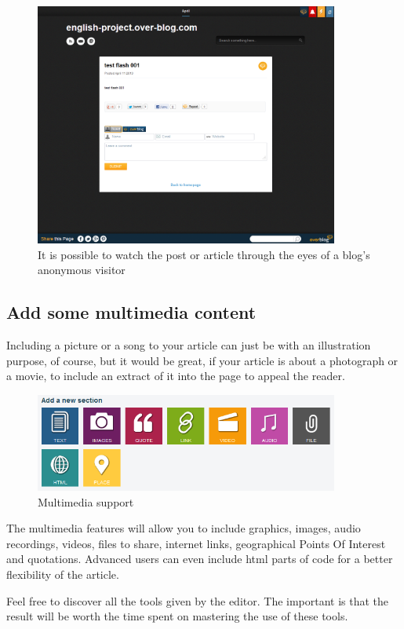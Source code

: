 \documentclass[a4paper,10pt]{article}
\begin{document}
\begin{figure}[H]
    \center
	\includegraphics[width=10cm]{Images/view001.png}
    \caption{It is possible to watch the post or article through the eyes of a blog's anonymous visitor}
\end{figure}

\newpage

\subsection{Add some multimedia content}

Including a picture or a song to your article can just be with an illustration purpose, of course, but it would be great, if your article is about a photograph or a movie, to include an extract of it into the page to appeal the reader. 

\begin{figure}[H]
    \center
	\includegraphics[width=10cm]{Images/multimedia001.png}
    \caption{Multimedia support}
\end{figure}

The multimedia features will allow you to include graphics, images, audio recordings, videos, files to share, internet links, geographical Points Of Interest and quotations. Advanced users can even include html parts of code for a better flexibility of the article. 

Feel free to discover all the tools given by the editor. The important is that the result will be worth the time spent on mastering the use of these tools. 
\end{document}
